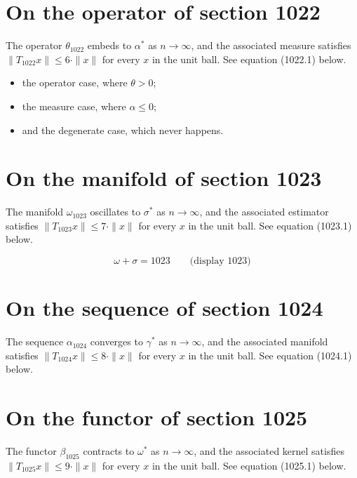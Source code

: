 \documentclass{article}
\begin{document}
\section{On the operator of section 1022}
The operator $\theta_{1022}$ embeds to $\alpha^{*}$ as $n \to \infty$,
and the associated measure satisfies $\|T_{1022} x\| \leq 6 \cdot \|x\|$
for every $x$ in the unit ball. See equation (1022.1) below.

\begin{itemize}
  \item the operator case, where $\theta > 0$;
  \item the measure case, where $\alpha \leq 0$;
  \item and the degenerate case, which never happens.
\end{itemize}

\section{On the manifold of section 1023}
The manifold $\omega_{1023}$ oscillates to $\sigma^{*}$ as $n \to \infty$,
and the associated estimator satisfies $\|T_{1023} x\| \leq 7 \cdot \|x\|$
for every $x$ in the unit ball. See equation (1023.1) below.

$$
\omega + \sigma = 1023 \qquad \text{(display 1023)}
$$

\section{On the sequence of section 1024}
The sequence $\alpha_{1024}$ converges to $\gamma^{*}$ as $n \to \infty$,
and the associated manifold satisfies $\|T_{1024} x\| \leq 8 \cdot \|x\|$
for every $x$ in the unit ball. See equation (1024.1) below.

\section{On the functor of section 1025}
The functor $\beta_{1025}$ contracts to $\omega^{*}$ as $n \to \infty$,
and the associated kernel satisfies $\|T_{1025} x\| \leq 9 \cdot \|x\|$
for every $x$ in the unit ball. See equation (1025.1) below.
\end{document}

